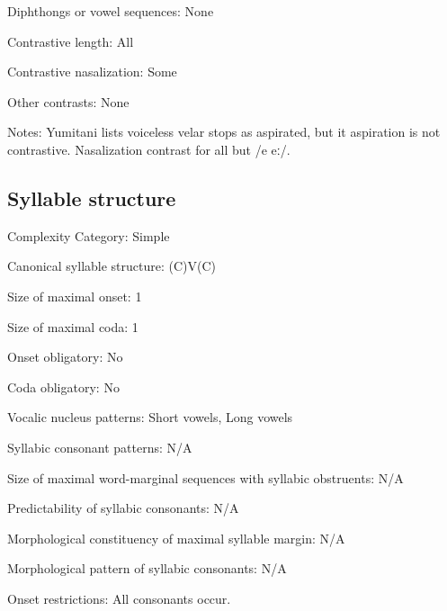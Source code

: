 {\begin{appendixdesc}
\item[Diphthongs or vowel sequences:] None

\item[Contrastive length:] All

\item[Contrastive nasalization:] Some

\item[Other contrasts:] None

\item[Notes:] Yumitani lists voiceless velar stops as aspirated, but it aspiration is not contrastive. Nasalization contrast for all but /e eː/.
\end{appendixdesc}
\subsection*{Syllable structure}
\begin{appendixdesc}

\item[Complexity Category:] Simple

\item[Canonical syllable structure:] (C)V(C) \citep[21--22]{Yumitani1998}

\item[Size of maximal onset:] 1

\item[Size of maximal coda:] 1

\item[Onset obligatory:] No

\item[Coda obligatory:] No

\item[Vocalic nucleus patterns:] Short vowels, Long vowels

\item[Syllabic consonant patterns:] N/A

\item[Size of maximal word-marginal sequences with syllabic obstruents:] N/A

\item[Predictability of syllabic consonants:] N/A

\item[Morphological constituency of maximal syllable margin:] N/A

\item[Morphological pattern of syllabic consonants:] N/A

\item[Onset restrictions:] All consonants occur.


\end{appendixdesc}}
